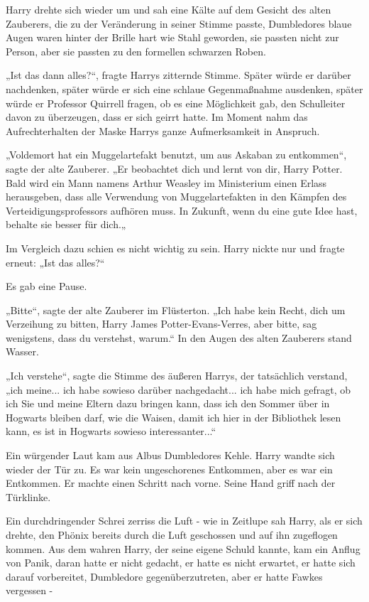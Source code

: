 {Harry drehte sich wieder um und sah eine Kälte auf dem Gesicht des alten Zauberers, die zu der Veränderung in seiner Stimme passte, Dumbledores blaue Augen waren hinter der Brille hart wie Stahl geworden, sie passten nicht zur Person, aber sie passten zu den formellen schwarzen Roben.

„Ist das dann alles?“, fragte Harrys zitternde Stimme. Später würde er darüber nachdenken, später würde er sich eine schlaue Gegenmaßnahme ausdenken, später würde er Professor Quirrell fragen, ob es eine Möglichkeit gab, den Schulleiter davon zu überzeugen, dass er sich geirrt hatte. Im Moment nahm das Aufrechterhalten der Maske Harrys ganze Aufmerksamkeit in Anspruch.

„Voldemort hat ein Muggelartefakt benutzt, um aus Askaban zu entkommen“, sagte der alte Zauberer. „Er beobachtet dich und lernt von dir, Harry Potter. Bald wird ein Mann namens Arthur Weasley im Ministerium einen Erlass herausgeben, dass alle Verwendung von Muggelartefakten in den Kämpfen des Verteidigungsprofessors aufhören muss. In Zukunft, wenn du eine gute Idee hast, behalte sie besser für dich.„

Im Vergleich dazu schien es nicht wichtig zu sein. Harry nickte nur und fragte erneut: „Ist das alles?“

Es gab eine Pause.

„Bitte“, sagte der alte Zauberer im Flüsterton. „Ich habe kein Recht, dich um Verzeihung zu bitten, Harry James Potter-Evans-Verres, aber bitte, sag wenigstens, dass du verstehst, warum.“ In den Augen des alten Zauberers stand Wasser.

„Ich verstehe“, sagte die Stimme des äußeren Harrys, der tatsächlich verstand, „ich meine... ich habe sowieso darüber nachgedacht... ich habe mich gefragt, ob ich Sie und meine Eltern dazu bringen kann, dass ich den Sommer über in Hogwarts bleiben darf, wie die Waisen, damit ich hier in der Bibliothek lesen kann, es ist in Hogwarts sowieso interessanter...“

Ein würgender Laut kam aus Albus Dumbledores Kehle. Harry wandte sich wieder der Tür zu. Es war kein ungeschorenes Entkommen, aber es war ein Entkommen. Er machte einen Schritt nach vorne. Seine Hand griff nach der Türklinke.

Ein durchdringender Schrei zerriss die Luft - wie in Zeitlupe sah Harry, als er sich drehte, den Phönix bereits durch die Luft geschossen und auf ihn zugeflogen kommen. Aus dem wahren Harry, der seine eigene Schuld kannte, kam ein Anflug von Panik, daran hatte er nicht gedacht, er hatte es nicht erwartet, er hatte sich darauf vorbereitet, Dumbledore gegenüberzutreten, aber er hatte Fawkes vergessen -

}
